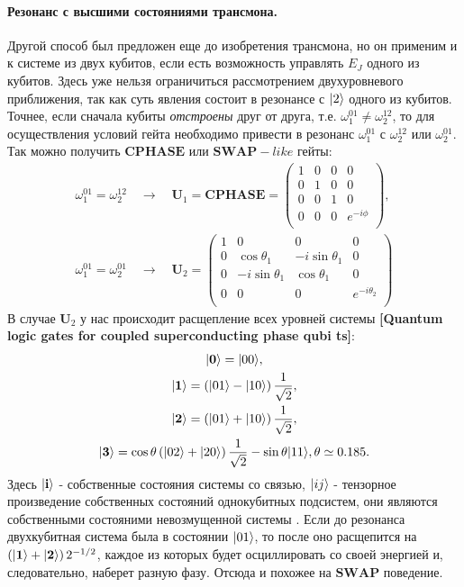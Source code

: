 \documentclass[12pt, twoside]{report}
\DeclarePairedDelimiter\ket{\lvert}{\rangle}
\numberwithin{equation}{section}
\numberwithin{figure}{section}
\begin{document}
\paragraph{Резонанс с высшими состояниями трансмона.} Другой способ был предложен еще до изобретения трансмона, но он применим и к системе из двух кубитов, если есть возможность управлять $E_J$ одного из кубитов. Здесь уже нельзя ограничиться рассмотрением двухуровневого приближения, так как суть явления состоит в резонансе с $\ket{2}$ одного из кубитов. Точнее, если сначала кубиты \textit{отстроены} друг от друга, т.е. $\omega^{01}_1 \neq \omega^{12}_2$, то для осуществления условий гейта необходимо привести в резонанс $\omega^{01}_1$ с $\omega^{12}_2$ или $\omega^{01}_2$. Так можно получить $\mathbf{CPHASE}$ или $\mathbf{SWAP}-like$ гейты:
\begin{gather}
\omega^{01}_1 = \omega^{12}_2 \quad \longrightarrow \quad \mathbf{U}_1 =  \mathbf{CPHASE} = 
\begin{pmatrix}
1 & 0 & 0 & 0 \\
0 & 1 & 0 & 0 \\
0 & 0 & 1 & 0 \\
0 & 0 & 0 & e^{-i \phi} \\
\end{pmatrix},\\
\omega^{01}_1 = \omega^{01}_2 \quad \longrightarrow \quad \mathbf{U}_2  = 
\begin{pmatrix}
1 & 0 & 0 & 0 \\
0 & \cos \theta_1 & -i \sin \theta_1 & 0 \\
0 & -i \sin \theta_1 & \cos \theta_1 & 0 \\
0 & 0 & 0 & e^{-i \theta_2} \\
\end{pmatrix}
\end{gather}
В случае $\mathbf{U}_2$ у нас происходит расщепление всех уровней системы \textbf{[Quantum logic gates for coupled superconducting phase qubi
ts]}:
\begin{gather*}
\ket{\mathbf{0}}  = \ket{00},\\
\ket{\mathbf{1}}  = \left( \ket{01} - \ket{10} \right) \frac{1}{\sqrt{2}}, \\
\ket{\mathbf{2}}  = \left( \ket{01} + \ket{10} \right) \frac{1}{\sqrt{2}}, \\
\ket{\mathbf{3}}  = \cos \theta \left( \ket{02} + \ket{20} \right) \frac{1}{\sqrt{2}} - \sin \theta \ket{11},
\theta \simeq 0.185.
\end{gather*}
Здесь $\ket{\mathbf{i}}$ - собственные состояния системы со связью, $\ket{ij}$ - тензорное произведение собственных состояний однокубитных подсистем, они являются собственными состояними невозмущенной системы . Если до резонанса двухкубитная система была в состоянии $\ket{01}$, то после оно расщепится на $\left( \ket{\mathbf{1}} + \ket{\mathbf{2}} \right) 2^{-1/2}$, каждое из которых будет осциллировать со своей энергией и, следовательно, наберет разную фазу. Отсюда и похожее на $\mathbf{SWAP}$ поведение. 
\end{document}
